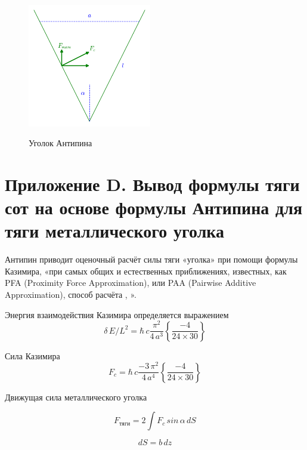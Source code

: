 \documentclass[11pt]{article}
\begin{document}
    \begin{figure}
\begin{center}
\includegraphics[width=0.48\textwidth]{Antipins_angle_ru.png}
\caption{}{Уголок Антипина}
\end{center}
\label{fig:Antipins_angle}
\end{figure}

    \section{Приложение D. Вывод формулы тяги сот на основе формулы Антипина
для тяги металлического
уголка}\label{ux43fux440ux438ux43bux43eux436ux435ux43dux438ux435-d.-ux432ux44bux432ux43eux434-ux444ux43eux440ux43cux443ux43bux44b-ux442ux44fux433ux438-ux441ux43eux442-ux43dux430-ux43eux441ux43dux43eux432ux435-ux444ux43eux440ux43cux443ux43bux44b-ux430ux43dux442ux438ux43fux438ux43dux430-ux434ux43bux44f-ux442ux44fux433ux438-ux43cux435ux442ux430ux43bux43bux438ux447ux435ux441ux43aux43eux433ux43e-ux443ux433ux43eux43bux43aux430}

    Антипин \cite{Antipin2012} приводит оценочный расчёт силы тяги «уголка»
при помощи формулы Казимира, «при самых общих и естественных
приближениях, известных, как PFA (Proximity Force Approximation), или
PAA (Pairwise Additive Approximation), способ расчёта
\cite{Intravaia2013}, \cite{Rodriguez2011}».

Энергия взаимодействия Казимира определяется выражением
\[\delta\,E/L^2 = \hbar\,c\frac{\pi^2}{4\,a^3}\left\{\frac{-4}{24\times30}\right\}\]

Сила Казимира
\[F_{c} = \hbar\,c\frac{-3\,\pi^2}{4\,a^4}\left\{\frac{-4}{24\times30}\right\}\]

Движущая сила металлического уголка

\[F_{тяги} = 2 \int F_{c} \, sin\, \alpha \,dS\]

\[dS = b\,dz\]
\end{document}
